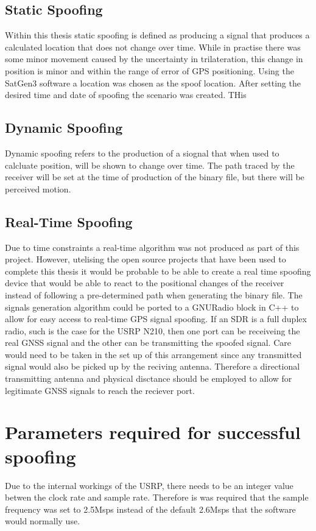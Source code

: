 \subsection{Static Spoofing}
Within this thesis static spoofing is defined as producing a signal that produces a calculated location that does not change over time. While in practise there was some
minor movement caused by the uncertainty in trilateration, this change in position is minor and within the range of error of GPS positioning.
Using the SatGen3 software a location was chosen as the spoof location. After setting the desired time and date of spoofing the scenario was created. THis 

\subsection{Dynamic Spoofing}
Dynamic spoofing refers to the production of a siognal that when used to calcluate position, will be shown to change over time. The path traced by the receiver will be
set at the time of production of the binary file, but there will be perceived motion.

\subsection{Real-Time Spoofing}
Due to time constraints a real-time algorithm was not produced as part of this project. However, utelising the open source projects that have been used to complete this
thesis it would be probable to be able to create a real time spoofing device that would be able to react to the positional changes of the receiver instead of following a
pre-determined path when generating the binary file. The signals generation algorithm could be ported to a GNURadio block in C++ to allow for easy access to real-time GPS
signal spoofing. If an SDR is a full duplex radio, such is the case for the USRP N210, then one port can be receiveing the real GNSS signal and the other can be
transmitting the spoofed signal. Care would need to be taken in the set up of this arrangement since any transmitted signal would also be picked up by the reciving
antenna. Therefore a directional transmitting antenna and physical disctance should be employed to allow for legitimate GNSS signals to reach the reciever port. 

\section{Parameters required for successful spoofing}
Due to the internal workings of the USRP, there needs to be an integer value betwen the clock rate and sample rate. Therefore is was required that the sample frequency
was set to 2.5Msps instead of the default 2.6Msps that the software would normally use.